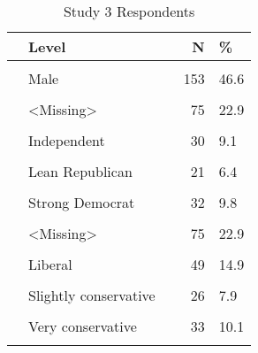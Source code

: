 \documentclass[border=1mm]{standalone}
\begin{document}
\begin{table}[!h]
\centering
\caption{Study 3 Respondents}
\centering
\begin{tabular}[t]{lllrl}
\toprule
  & Level &   & N & \%\\
\midrule
\cellcolor{gray!10}{Sex} & \cellcolor{gray!10}{Female} & \cellcolor{gray!10}{} & \cellcolor{gray!10}{99} & \cellcolor{gray!10}{30.2}\\
 & Male &  & 153 & 46.6\\
\cellcolor{gray!10}{} & \cellcolor{gray!10}{other} & \cellcolor{gray!10}{} & \cellcolor{gray!10}{1} & \cellcolor{gray!10}{0.3}\\
 & <Missing> &  & 75 & \vphantom{4} 22.9\\
\cellcolor{gray!10}{Party} & \cellcolor{gray!10}{Democrat} & \cellcolor{gray!10}{} & \cellcolor{gray!10}{40} & \cellcolor{gray!10}{12.2}\\
\addlinespace
 & Independent &  & 30 & 9.1\\
\cellcolor{gray!10}{} & \cellcolor{gray!10}{Lean Democrat} & \cellcolor{gray!10}{} & \cellcolor{gray!10}{25} & \cellcolor{gray!10}{7.6}\\
 & Lean Republican &  & 21 & 6.4\\
\cellcolor{gray!10}{} & \cellcolor{gray!10}{Republican} & \cellcolor{gray!10}{} & \cellcolor{gray!10}{60} & \cellcolor{gray!10}{18.3}\\
 & Strong Democrat &  & 32 & 9.8\\
\addlinespace
\cellcolor{gray!10}{} & \cellcolor{gray!10}{Strong Republican} & \cellcolor{gray!10}{} & \cellcolor{gray!10}{45} & \cellcolor{gray!10}{13.7}\\
 & <Missing> &  & 75 & \vphantom{3} 22.9\\
\cellcolor{gray!10}{Ideology} & \cellcolor{gray!10}{Conservative} & \cellcolor{gray!10}{} & \cellcolor{gray!10}{32} & \cellcolor{gray!10}{9.8}\\
 & Liberal &  & 49 & 14.9\\
\cellcolor{gray!10}{} & \cellcolor{gray!10}{Moderate} & \cellcolor{gray!10}{} & \cellcolor{gray!10}{42} & \cellcolor{gray!10}{12.8}\\
\addlinespace
 & Slightly conservative &  & 26 & 7.9\\
\cellcolor{gray!10}{} & \cellcolor{gray!10}{Slightly liberal} & \cellcolor{gray!10}{} & \cellcolor{gray!10}{28} & \cellcolor{gray!10}{8.5}\\
 & Very conservative &  & 33 & 10.1\\
\cellcolor{gray!10}{} & \cellcolor{gray!10}{Very liberal} & \cellcolor{gray!10}{} & \cellcolor{gray!10}{43} & \cellcolor{gray!10}{13.1}\\

\end{tabular}
\end{table}
\end{document}
